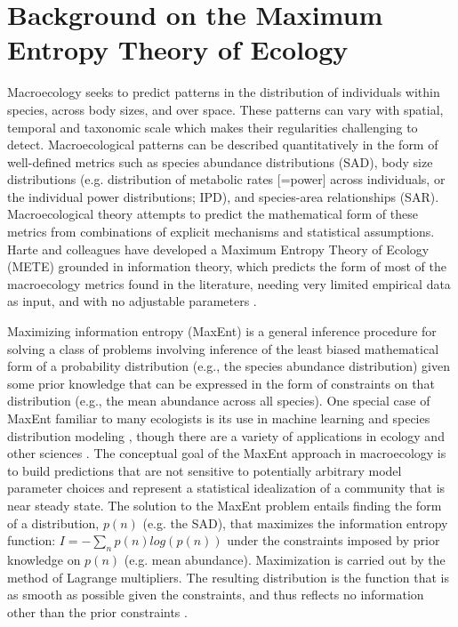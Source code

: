 \clearpage


\section{Background on the Maximum Entropy Theory of Ecology}
Macroecology \citep{Brown:1995ui} seeks to predict patterns in the
distribution of individuals within species, across body sizes, and
over space. These patterns can vary with spatial, temporal and
taxonomic scale which makes their regularities challenging to detect.
Macroecological patterns can be described quantitatively in the form
of well-defined metrics such as species abundance distributions (SAD),
body size distributions (e.g. distribution of metabolic rates [=power]
across individuals, or the individual power distributions; IPD), and
species-area relationships (SAR). Macroecological theory attempts to
predict the mathematical form of these metrics from combinations of
explicit mechanisms and statistical assumptions. Harte and colleagues
have developed a Maximum Entropy Theory of Ecology (METE) grounded in
information theory, which predicts the form of most of the
macroecology metrics found in the literature, needing very limited
empirical data as input, and with no adjustable parameters
\citep{Harte:2008uf, Harte:2009it, Harte:2011ut}.

Maximizing information entropy (MaxEnt) is a general inference
procedure for solving a class of problems involving inference of the
least biased mathematical form of a probability distribution (e.g.,
the species abundance distribution) given some prior knowledge that
can be expressed in the form of constraints on that distribution
(e.g., the mean abundance across all species). One special case of
MaxEnt familiar to many ecologists is its use in machine learning and
species distribution modeling \citep[SDM;][]{Phillips:2006vf}, though
there are a variety of applications in ecology \citep{Shipley:2006ui,
  Williams:2010uk} and other sciences \citep[e.g.][]{Skilling:1988tj,
  Jaynes:2003ua, Banavar:2010tz}. The conceptual goal of the MaxEnt
approach in macroecology is to build predictions that are not
sensitive to potentially arbitrary model parameter choices and
represent a statistical idealization of a community that is near
steady state. The solution to the MaxEnt problem entails finding the
form of a distribution, $p(n)$ (e.g. the SAD), that maximizes the
information entropy function: $I = - \sum_{n} p(n) log(p(n))$ under
the constraints imposed by prior knowledge on $p(n)$ (e.g. mean
abundance). Maximization is carried out by the method of Lagrange
multipliers. The resulting distribution is the function that is as
smooth as possible given the constraints, and thus reflects no
information other than the prior constraints \citep{Jaynes:1957to,
  Jaynes:1982eg}.
  
